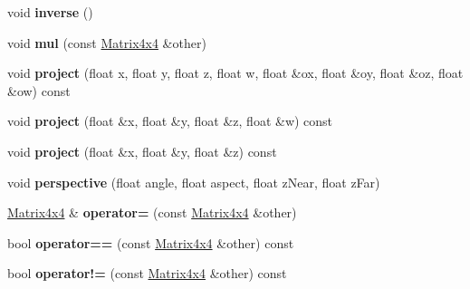 \begin{DoxyCompactItemize}
\item 
\hypertarget{class_tempest_1_1_matrix4x4_af170363c534f4013b55ac183f27eaf1c}{void {\bfseries inverse} ()}\label{class_tempest_1_1_matrix4x4_af170363c534f4013b55ac183f27eaf1c}

\item 
\hypertarget{class_tempest_1_1_matrix4x4_a022f02c16a837c7519015a7e5bb5739a}{void {\bfseries mul} (const \hyperlink{class_tempest_1_1_matrix4x4}{Matrix4x4} \&other)}\label{class_tempest_1_1_matrix4x4_a022f02c16a837c7519015a7e5bb5739a}

\item 
\hypertarget{class_tempest_1_1_matrix4x4_a57f6ac185aa1102946eec2e1f0811066}{void {\bfseries project} (float x, float y, float z, float w, float \&ox, float \&oy, float \&oz, float \&ow) const }\label{class_tempest_1_1_matrix4x4_a57f6ac185aa1102946eec2e1f0811066}

\item 
\hypertarget{class_tempest_1_1_matrix4x4_a0d65a09345281257ec7ea29aaae7689b}{void {\bfseries project} (float \&x, float \&y, float \&z, float \&w) const }\label{class_tempest_1_1_matrix4x4_a0d65a09345281257ec7ea29aaae7689b}

\item 
\hypertarget{class_tempest_1_1_matrix4x4_a4b1227b8089deea5c22a4051eec1f44b}{void {\bfseries project} (float \&x, float \&y, float \&z) const }\label{class_tempest_1_1_matrix4x4_a4b1227b8089deea5c22a4051eec1f44b}

\item 
\hypertarget{class_tempest_1_1_matrix4x4_aa67072b4a0a797409b9b84997abf984a}{void {\bfseries perspective} (float angle, float aspect, float z\+Near, float z\+Far)}\label{class_tempest_1_1_matrix4x4_aa67072b4a0a797409b9b84997abf984a}

\item 
\hypertarget{class_tempest_1_1_matrix4x4_af1f14056e11a9612b284c26fadb8035c}{\hyperlink{class_tempest_1_1_matrix4x4}{Matrix4x4} \& {\bfseries operator=} (const \hyperlink{class_tempest_1_1_matrix4x4}{Matrix4x4} \&other)}\label{class_tempest_1_1_matrix4x4_af1f14056e11a9612b284c26fadb8035c}

\item 
\hypertarget{class_tempest_1_1_matrix4x4_ae59134f352ad9265efdd8a11affe1b81}{bool {\bfseries operator==} (const \hyperlink{class_tempest_1_1_matrix4x4}{Matrix4x4} \&other) const }\label{class_tempest_1_1_matrix4x4_ae59134f352ad9265efdd8a11affe1b81}

\item 
\hypertarget{class_tempest_1_1_matrix4x4_a0990e7afc66f0f5c9c22095859103891}{bool {\bfseries operator!=} (const \hyperlink{class_tempest_1_1_matrix4x4}{Matrix4x4} \&other) const }\label{class_tempest_1_1_matrix4x4_a0990e7afc66f0f5c9c22095859103891}

\end{DoxyCompactItemize}


